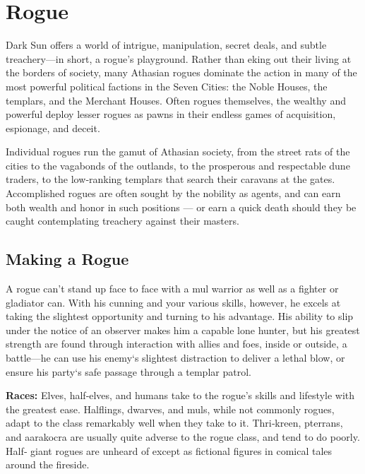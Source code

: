 \section{Rogue}

Dark Sun offers a world of intrigue, manipulation, secret deals, and subtle treachery—in short, a rogue's playground. Rather than eking out their living at the
borders of society, many Athasian rogues dominate the action in many of the most powerful political factions in the Seven Cities: the Noble Houses, the templars, and the Merchant Houses. Often rogues themselves, the wealthy and powerful deploy lesser rogues as pawns in their endless games of acquisition, espionage, and deceit.

Individual rogues run the gamut of Athasian society, from the street rats of the cities to the vagabonds of the outlands, to the prosperous and respectable dune traders, to the low‐ranking templars that search their caravans at the gates. Accomplished rogues are often sought by the nobility as agents, and can earn both wealth and honor in such positions --- or earn a quick death should they be caught contemplating treachery against their masters.

\subsection{Making a Rogue}

A rogue can't stand up face to face with a mul warrior as well as a fighter or gladiator can. With his cunning and your various skills, however, he excels at taking the slightest opportunity and turning to his advantage. His ability to slip under the notice of an observer makes him a capable lone hunter, but his greatest strength are found through interaction with allies and foes, inside or outside, a battle—he can use his enemy`s slightest distraction to deliver a lethal blow, or ensure his party`s safe passage through a templar patrol.

\textbf{Races:} Elves, half‐elves, and humans take to the rogue's skills and lifestyle with the greatest ease. Halflings, dwarves, and muls, while not commonly rogues, adapt to the class remarkably well when they take to it. Thri‐kreen, pterrans, and aarakocra are usually quite adverse to the rogue class, and tend to do poorly. Half‐
giant rogues are unheard of except as fictional figures in comical tales around the fireside.


